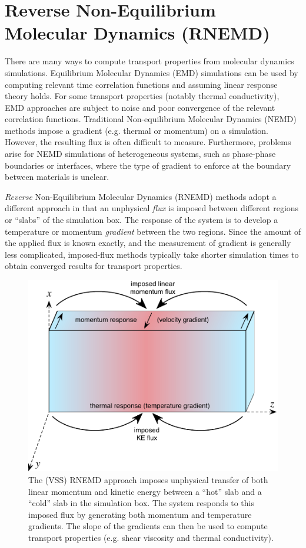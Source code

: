 \documentclass[]{book}
\begin{document}
\chapter{\label{section:rnemd}Reverse Non-Equilibrium Molecular Dynamics (RNEMD)}

There are many ways to compute transport properties from molecular
dynamics simulations.  Equilibrium Molecular Dynamics (EMD)
simulations can be used by computing relevant time correlation
functions and assuming linear response theory holds.  For some transport properties (notably thermal conductivity), EMD approaches
are subject to noise and poor convergence of the relevant
correlation functions. Traditional Non-equilibrium Molecular Dynamics
(NEMD) methods impose a gradient (e.g. thermal or momentum) on a
simulation.  However, the resulting flux is often difficult to
measure. Furthermore, problems arise for NEMD simulations of
heterogeneous systems, such as phase-phase boundaries or interfaces,
where the type of gradient to enforce at the boundary between
materials is unclear.

{\it Reverse} Non-Equilibrium Molecular Dynamics (RNEMD) methods adopt
a different approach in that an unphysical {\it flux} is imposed
between different regions or ``slabs'' of the simulation box.  The
response of the system is to develop a temperature or momentum {\it
  gradient} between the two regions. Since the amount of the applied
flux is known exactly, and the measurement of gradient is generally
less complicated, imposed-flux methods typically take shorter
simulation times to obtain converged results for transport properties.

\begin{figure}
\includegraphics[width=\linewidth]{rnemdDemo}
\caption[Illustration of energy exchange in the VSS RNEMD method]{The (VSS) RNEMD approach imposes unphysical transfer of both
  linear momentum and kinetic energy between a ``hot'' slab and a
  ``cold'' slab in the simulation box.  The system responds to this
  imposed flux by generating both momentum and temperature gradients.
  The slope of the gradients can then be used to compute transport
  properties (e.g. shear viscosity and thermal conductivity).}
\label{rnemdDemo}
\end{figure}
\end{document}
